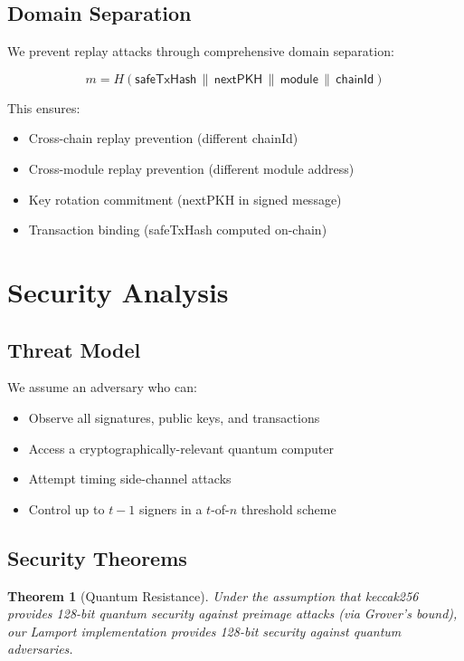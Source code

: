 \documentclass[11pt,a4paper]{article}
\newtheorem{theorem}{Theorem}
\begin{document}
\subsection{Domain Separation}

We prevent replay attacks through comprehensive domain separation:

\begin{equation}
m = H(\mathsf{safeTxHash} \,\|\, \mathsf{nextPKH} \,\|\, \mathsf{module} \,\|\, \mathsf{chainId})
\end{equation}

This ensures:
\begin{itemize}
    \item Cross-chain replay prevention (different chainId)
    \item Cross-module replay prevention (different module address)
    \item Key rotation commitment (nextPKH in signed message)
    \item Transaction binding (safeTxHash computed on-chain)
\end{itemize}

\section{Security Analysis}

\subsection{Threat Model}

We assume an adversary who can:
\begin{itemize}
    \item Observe all signatures, public keys, and transactions
    \item Access a cryptographically-relevant quantum computer
    \item Attempt timing side-channel attacks
    \item Control up to $t-1$ signers in a $t$-of-$n$ threshold scheme
\end{itemize}

\subsection{Security Theorems}

\begin{theorem}[Quantum Resistance]
Under the assumption that keccak256 provides 128-bit quantum security against preimage attacks (via Grover's bound), our Lamport implementation provides 128-bit security against quantum adversaries.
\end{theorem}
\end{document}
